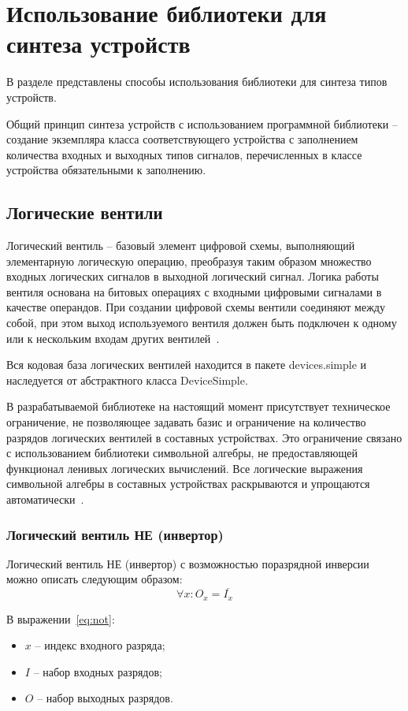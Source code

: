 \documentclass[document.tex]{subfiles}
\begin{document}
\clearpage\section{Использование библиотеки для синтеза устройств}
В разделе представлены способы использования библиотеки для синтеза типов
устройств.

Общий принцип синтеза устройств с использованием программной библиотеки --
создание экземпляра класса соответствующего устройства с заполнением
количества входных и выходных типов сигналов, перечисленных в классе устройства
обязательными к заполнению.
\subsection{Логические вентили}
Логический вентиль -- базовый элемент цифровой схемы, выполняющий элементарную
логическую операцию, преобразуя таким образом множество входных логических
сигналов в выходной логический сигнал. Логика работы вентиля основана на битовых
операциях с входными цифровыми сигналами в качестве операндов. При создании
цифровой схемы вентили соединяют между собой, при этом выход используемого
вентиля должен быть подключен к одному или к нескольким входам других
вентилей~\cite{wikigates}.

Вся кодовая база логических вентилей находится в пакете devices.simple и
наследуется от абстрактного класса DeviceSimple.

В разрабатываемой библиотеке на настоящий момент присутствует техническое
ограничение, не позволяющее задавать базис и ограничение на количество разрядов
логических вентилей в составных устройствах. Это ограничение связано с
использованием библиотеки символьной алгебры, не предоставляющей функционал
ленивых логических вычислений. Все логические выражения символьной алгебры в
составных устройствах раскрываются и упрощаются автоматически~\cite{sympydoc}.

\clearpage
\subsubsection{Логический вентиль НЕ (инвертор)}
Логический вентиль НЕ (инвертор) с
возможностью поразрядной инверсии можно описать следующим образом:
\begin{equation}
\label{eq:not}
\forall x: O_x = \overline{I_x}
\end{equation}

В выражении~\ref{eq:not}:
\begin{itemize}[noitemsep]
  \item $x$ -- индекс входного разряда;
  \item $I$ -- набор входных разрядов;
  \item $O$ -- набор выходных разрядов.
\end{itemize}
\end{document}
